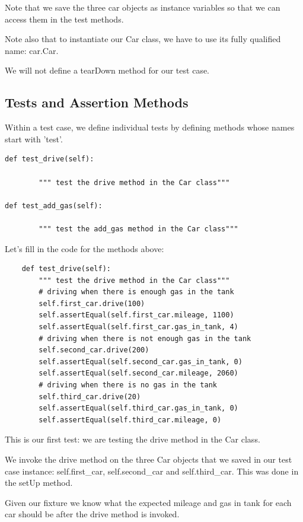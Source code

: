 \documentclass{article}
\begin{document}
Note that we save the three car objects as instance variables so that we can access them in the test methods.

Note also that to instantiate our Car class, we have to use its fully qualified name:  car.Car.

We will not define a tearDown method for our test case.

\subsection{Tests and Assertion Methods}
Within a test case, we define individual tests by defining methods whose names start with 'test'.

\begin{lstlisting}
def test_drive(self):

        """ test the drive method in the Car class"""  

def test_add_gas(self):

        """ test the add_gas method in the Car class"""  
\end{lstlisting}

Let's fill in the code for the methods above:

\begin{lstlisting}
    def test_drive(self):
        """ test the drive method in the Car class""" 
        # driving when there is enough gas in the tank
        self.first_car.drive(100)
        self.assertEqual(self.first_car.mileage, 1100)
        self.assertEqual(self.first_car.gas_in_tank, 4)
        # driving when there is not enough gas in the tank
        self.second_car.drive(200)
        self.assertEqual(self.second_car.gas_in_tank, 0)
        self.assertEqual(self.second_car.mileage, 2060)
        # driving when there is no gas in the tank
        self.third_car.drive(20)
        self.assertEqual(self.third_car.gas_in_tank, 0)
        self.assertEqual(self.third_car.mileage, 0)
\end{lstlisting}

This is our first test:  we are testing the drive method in the Car class.

We invoke the drive method on the three Car objects that we saved in our test case instance: self.first{\_}car, self.second{\_}car and self.third{\_}car.  This was done in the setUp method.

Given our fixture we know what the expected mileage and gas in tank for each car should be after the drive method is invoked.  
\end{document}
